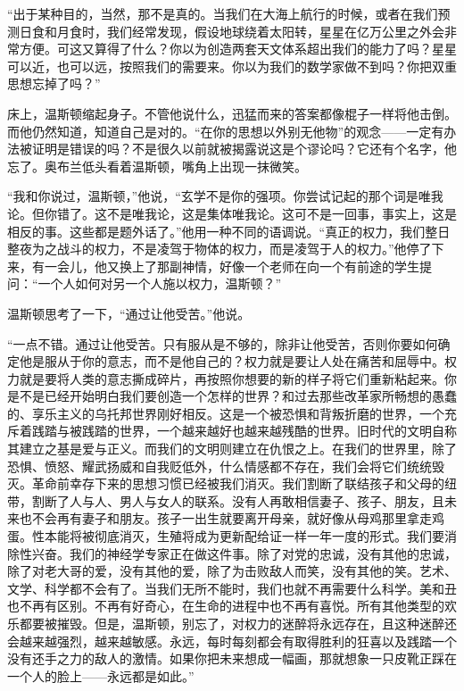``出于某种目的，当然，那不是真的。当我们在大海上航行的时候，或者在我们预测日食和月食时，我们经常发现，假设地球绕着太阳转，星星在亿万公里之外会非常方便。可这又算得了什么？你以为创造两套天文体系超出我们的能力了吗？星星可以近，也可以远，按照我们的需要来。你以为我们的数学家做不到吗？你把双重思想忘掉了吗？''

床上，温斯顿缩起身子。不管他说什么，迅猛而来的答案都像棍子一样将他击倒。而他仍然知道，知道自己是对的。``在你的思想以外别无他物''的观念——一定有办法被证明是错误的吗？不是很久以前就被揭露说这是个谬论吗？它还有个名字，他忘了。奥布兰低头看着温斯顿，嘴角上出现一抹微笑。

``我和你说过，温斯顿，''他说，``玄学不是你的强项。你尝试记起的那个词是唯我论。但你错了。这不是唯我论，这是集体唯我论。这可不是一回事，事实上，这是相反的事。这些都是题外话了。''他用一种不同的语调说。``真正的权力，我们整日整夜为之战斗的权力，不是凌驾于物体的权力，而是凌驾于人的权力。''他停了下来，有一会儿，他又换上了那副神情，好像一个老师在向一个有前途的学生提问：``一个人如何对另一个人施以权力，温斯顿？''

温斯顿思考了一下，``通过让他受苦。''他说。

``一点不错。通过让他受苦。只有服从是不够的，除非让他受苦，否则你要如何确定他是服从于你的意志，而不是他自己的？权力就是要让人处在痛苦和屈辱中。权力就是要将人类的意志撕成碎片，再按照你想要的新的样子将它们重新粘起来。你是不是已经开始明白我们要创造一个怎样的世界？和过去那些改革家所畅想的愚蠢的、享乐主义的乌托邦世界刚好相反。这是一个被恐惧和背叛折磨的世界，一个充斥着践踏与被践踏的世界，一个越来越好也越来越残酷的世界。旧时代的文明自称其建立之基是爱与正义。而我们的文明则建立在仇恨之上。在我们的世界里，除了恐惧、愤怒、耀武扬威和自我贬低外，什么情感都不存在，我们会将它们统统毁灭。革命前幸存下来的思想习惯已经被我们消灭。我们割断了联结孩子和父母的纽带，割断了人与人、男人与女人的联系。没有人再敢相信妻子、孩子、朋友，且未来也不会再有妻子和朋友。孩子一出生就要离开母亲，就好像从母鸡那里拿走鸡蛋。性本能将被彻底消灭，生殖将成为更新配给证一样一年一度的形式。我们要消除性兴奋。我们的神经学专家正在做这件事。除了对党的忠诚，没有其他的忠诚，除了对老大哥的爱，没有其他的爱，除了为击败敌人而笑，没有其他的笑。艺术、文学、科学都不会有了。当我们无所不能时，我们也就不再需要什么科学。美和丑也不再有区别。不再有好奇心，在生命的进程中也不再有喜悦。所有其他类型的欢乐都要被摧毁。但是，温斯顿，别忘了，对权力的迷醉将永远存在，且这种迷醉还会越来越强烈，越来越敏感。永远，每时每刻都会有取得胜利的狂喜以及践踏一个没有还手之力的敌人的激情。如果你把未来想成一幅画，那就想象一只皮靴正踩在一个人的脸上——永远都是如此。''

